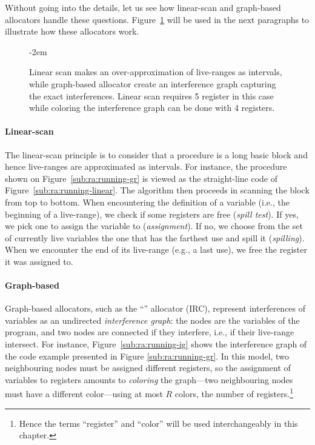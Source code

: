{Without going into the details, let us see how linear-scan and graph-based allocators handle these questions.
Figure~\ref{fig:ra:running} will be used in the next paragraphs to illustrate how these allocators work.

\begin{figure}
    \kern-2em
  \caption{Linear scan makes an over-approximation of live-ranges as
    intervals, while graph-based allocator create an interference graph 
    capturing the exact interferences. Linear scan requires 5 register 
    in this case while coloring the interference graph can be done with 
    4 registers.}
  \label{fig:ra:running}
\end{figure}


\paragraph{Linear-scan} The linear-scan principle is to consider that a procedure is a long basic block and hence live-ranges are approximated as intervals.
For instance, the procedure shown on Figure~\ref{sub:ra:running-gr} is viewed as the straight-line code of Figure~\ref{sub:ra:running-linear}.
The algorithm then proceeds in scanning the block from top to bottom.
When encountering the definition of a variable (i.e., the beginning of a live-range), we check if some registers are free (\emph{spill test}).
If yes, we pick one to assign the variable to (\emph{assignment}). If no, we choose from the set of currently live variables the one that has the farthest use and spill it (\emph{spilling}).
When we encounter the end of its live-range (e.g., a last use), we free the register it was assigned to.

\paragraph{Graph-based}
Graph-based allocators, such as the ``\irc'' allocator (IRC), represent interferences of variables as an undirected \emph{interference graph}: the nodes are the variables of the program, and two nodes are connected if they interfere, i.e., if their live-range intersect.
For instance, Figure~\ref{sub:ra:running-ig} shows the interference graph of the code example presented in Figure \ref{sub:ra:running-gr}.
In this model, two neighbouring nodes must be assigned different registers, so the assignment of variables to registers amounts to \emph{coloring} the graph---two neighbouring nodes must have a different color---using at most $R$ colors, the number of registers.\footnote{Hence the terms ``register'' and ``color'' will be used interchangeably in this chapter.}

}
